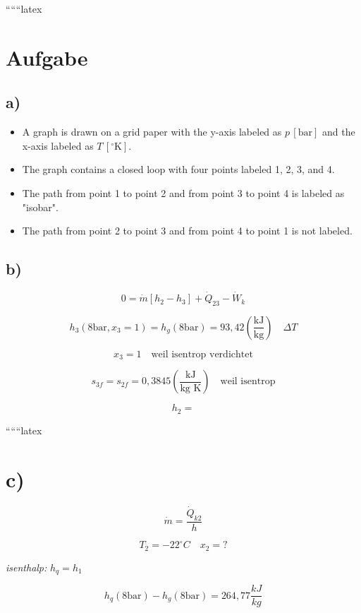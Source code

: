 
``````latex


\section*{Aufgabe}

\subsection*{a)}

\begin{itemize}
    \item A graph is drawn on a grid paper with the y-axis labeled as $p \, [\text{bar}]$ and the x-axis labeled as $T \, [^\circ \text{K}]$.
    \item The graph contains a closed loop with four points labeled 1, 2, 3, and 4.
    \item The path from point 1 to point 2 and from point 3 to point 4 is labeled as "isobar".
    \item The path from point 2 to point 3 and from point 4 to point 1 is not labeled.
\end{itemize}

\subsection*{b)}

\[
0 = \dot{m} \left[ h_2 - h_3 \right] + \dot{Q}_{23} - \dot{W}_k
\]

\[
h_3 (8 \text{bar}, x_3 = 1) = h_g (8 \text{bar}) = 93,42 \left( \frac{\text{kJ}}{\text{kg}} \right) \quad \Delta T
\]

\[
x_3 = 1 \quad \text{weil isentrop verdichtet}
\]

\[
s_{3f} = s_{2f} = 0,3845 \left( \frac{\text{kJ}}{\text{kg K}} \right) \quad \text{weil isentrop}
\]

\[
h_2 =
\]

``````latex


\section*{c)}

\[
\dot{m} = \frac{\dot{Q}_{k2}}{h}
\]

\[
T_2 = -22^\circ C \quad x_2 = ?
\]

\textit{isenthalp:} \quad \( h_{q} = h_{1} \)

\[
h_q (8 \text{bar}) - h_g (8 \text{bar}) = 264,77 \frac{kJ}{kg}
\]

